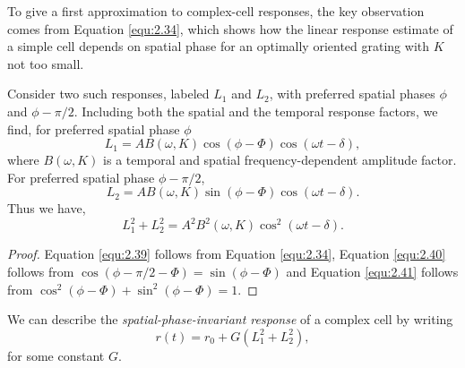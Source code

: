 \begin{rem}
  To give a first approximation to complex-cell responses, the key
  observation comes from Equation \ref{equ:2.34}, which shows how the linear response estimate of a simple cell depends on spatial phase for an optimally oriented grating with $K$ not too small.
\end{rem}

\begin{prop}
  Consider two such responses, labeled $L_1$ and $L_2$, with preferred spatial phases $\phi$ and $\phi-\pi/2$. Including both the spatial and the temporal response factors, we find, for preferred spatial phase $\phi$
  \begin{equation}
    \label{equ:2.39}
    L_1=AB(\omega,K)\cos(\phi-\Phi)\cos(\omega t-\delta),
  \end{equation}
  where $B(\omega, K)$ is a temporal and spatial frequency-dependent amplitude factor. For preferred spatial phase $\phi-\pi/2$,
  \begin{equation}
    \label{equ:2.40}
    L_2=AB(\omega,K)\sin(\phi-\Phi)\cos(\omega t-\delta).
  \end{equation}
  Thus we have,
  \begin{equation}
    \label{equ:2.41}
    L_1^2+L_2^2=A^2B^2(\omega,K)\cos^2(\omega t-\delta).
  \end{equation}
\end{prop}
\begin{proof}
  Equation \ref{equ:2.39} follows from Equation \ref{equ:2.34}, Equation \ref{equ:2.40} follows from $\cos(\phi-\pi/2-\Phi) = \sin(\phi-\Phi)$ and Equation \ref{equ:2.41} follows from $\cos^2(\phi-\Phi)+\sin^2(\phi-\Phi) = 1$.
\end{proof}

\begin{defn}
  \label{def:spatialPhaseInvariantResponse}
  We can describe the \emph{spatial-phase-invariant response} of a complex cell by writing
  \begin{equation}
    \label{equ:2.42}
    r(t)=r_0+G(L_1^2+L_2^2),
  \end{equation}
  for some constant $G$. 
\end{defn}


